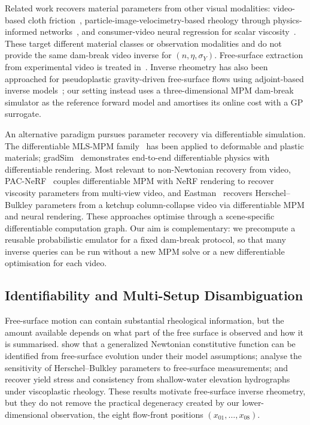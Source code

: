 Related work recovers material parameters from other visual
modalities: video-based cloth friction~\cite{rasheed2020visual},
particle-image-velocimetry-based rheology through physics-informed
networks~\cite{thakur2025learning}, and consumer-video neural
regression for scalar viscosity~\cite{rauzan2024protorheology}. These
target different material classes or observation modalities and do
not provide the same dam-break video inverse for
$(n,\eta,\sigma_Y)$. Free-surface extraction from experimental video
is treated in~\cite{cochard2009tracking}. Inverse rheometry has also
been approached for pseudoplastic gravity-driven free-surface flows
using adjoint-based inverse models~\cite{martin2015inverse}; our
setting instead uses a three-dimensional MPM dam-break simulator as
the reference forward model and amortises its online cost with a
GP surrogate.

An alternative paradigm pursues parameter recovery via differentiable
simulation. The differentiable MLS-MPM
family~\cite{hu2019chainqueen,hu2020difftaichi,huang2021plasticinelab}
has been applied to deformable and plastic materials;
gradSim~\cite{murthy2021gradsim} demonstrates end-to-end
differentiable physics with differentiable rendering. Most relevant
to non-Newtonian recovery from video,
PAC-NeRF~\cite{li2023pacnerf} couples differentiable MPM with NeRF
rendering to recover viscosity parameters from multi-view video, and
Eastman~\cite{eastman2024recovery} recovers Herschel--Bulkley
parameters from a ketchup column-collapse video via differentiable
MPM and neural rendering. These approaches optimise through a
scene-specific differentiable computation graph. Our aim is
complementary: we precompute a reusable probabilistic emulator for a
fixed dam-break protocol, so that many inverse queries can be run
without a new MPM solve or a new differentiable optimisation for each
video.


\subsection{Identifiability and Multi-Setup Disambiguation}

Free-surface motion can contain substantial rheological information,
but the amount available depends on what part of the free surface is
observed and how it is summarised. \citet{martinpritchard2022inferring}
show that a generalized Newtonian constitutive function can be
identified from free-surface evolution under their model assumptions;
\citet{ahmadi2022identification} analyse the sensitivity of
Herschel--Bulkley parameters to free-surface measurements; and
\citet{muchiri2024identification} recover yield stress and
consistency from shallow-water elevation hydrographs under
viscoplastic rheology. These results motivate free-surface inverse
rheometry, but they do not remove the practical degeneracy created by
our lower-dimensional observation, the eight flow-front positions
$(x_{01},\ldots,x_{08})$.

